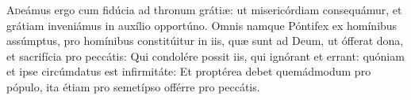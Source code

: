 
\lettrine{A}{d}eámus ergo cum fidúcia ad thronum grátiæ: ut misericórdiam consequámur, et grátiam inveniámus in auxílio opportúno. 
Omnis namque Póntifex ex homínibus assúmptus, pro homínibus con\-stitúitur in iis, quæ sunt ad Deum, ut ófferat dona, et sacrifícia pro peccátis:
Qui condolére possit iis, qui ignórant et errant: quóniam et ipse circúmdatus est infirmitáte:
Et pro\-ptérea debet quem\-ád\-modum pro pópulo, ita étiam pro semetí\-pso offérre pro peccátis.